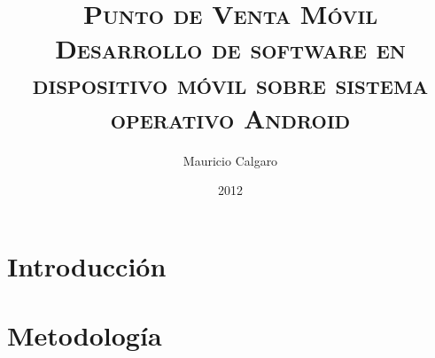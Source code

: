 \documentclass{ubpthesisb}
\author{Mauricio Calgaro}
\title{
	\textsc{\textbf{
		Punto de Venta M\'ovil\\
		\LARGE{Desarrollo de software en dispositivo m\'ovil sobre sistema operativo Android}
	}}
}
\date{2012}
\begin{document}


\renewcommand{\tablename}{Tabla}
\renewcommand{\listtablename}{\'Indice de tablas}

\maketitle

\frontmatter

\begin{acknowledgements}
	
\end{acknowledgements}

\begin{dedicate}
	
\end{dedicate}

\begin{resumen}
		
\end{resumen}

\tableofcontents
\listoffigures
\listoftables


\mainmatter

\acresetall
\part{Introducci\'on}


\acresetall
\part{Metodolog\'ia}




%


%
%
%
%
%
%
\end{document}
